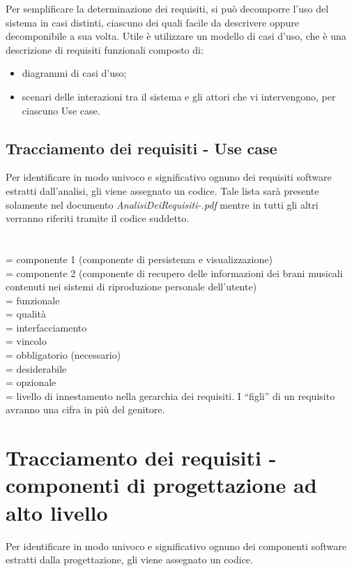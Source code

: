 Per semplificare la determinazione dei requisiti, si pu\`o decomporre l'uso
del sistema in casi distinti, ciascuno dei quali facile da
descrivere oppure decomponibile a sua volta.
Utile \`e utilizzare un modello di casi d'uso, che \`e una descrizione di
requisiti funzionali composto di:
\begin{itemize}
  \item diagrammi di casi d'uso;
  \item scenari delle interazioni tra il sistema e gli attori che vi
  intervengono, per ciascuno Use case.
\end{itemize}

\subsection{Tracciamento dei requisiti - Use case}
Per identificare in modo univoco e significativo ognuno dei requisiti software
estratti dall'analisi, gli viene assegnato un codice.
Tale lista sar\`a presente solamente nel documento
\emph{AnalisiDeiRequisiti-\versioneAR.pdf} mentre in tutti gli altri verranno
riferiti tramite il codice suddetto.
\\
\\
\\
 = componente 1 (componente di persistenza e visualizzazione)\\
 = componente 2 (componente di recupero delle informazioni dei brani
musicali contenuti nei sistemi di riproduzione personale dell'utente)\\
 = funzionale\\
 = qualit\`a\\
 = interfacciamento\\
 = vincolo\\
 = obbligatorio (necessario)\\
 = desiderabile\\
 = opzionale\\
 = livello di innestamento nella gerarchia dei requisiti. I ``figli'' di
un requisito avranno una cifra in pi\`u del genitore.

\section{Tracciamento dei requisiti - componenti di progettazione ad alto
livello} Per identificare in modo univoco e significativo ognuno dei componenti
software estratti dalla progettazione, gli viene assegnato un codice.
\newpage
